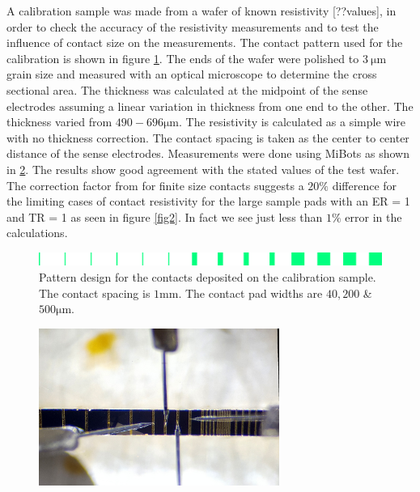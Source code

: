 A calibration sample was made from a wafer of known resistivity [??values], in order to check the accuracy of the resistivity measurements and to test the influence of contact size on the measurements. The contact pattern used for the calibration is shown in figure \ref{fig:testwafer}. The ends of the wafer were polished to $\SI{3}{\micro\meter}$ grain size and measured with an optical microscope to determine the cross sectional area. The thickness was calculated at the midpoint of the sense electrodes assuming a linear variation in thickness from one end to the other. The thickness varied from $490 - 696 \si{\micro \meter}$. The resistivity is calculated as a simple wire with no thickness correction. The contact spacing is taken as the center to center distance of the sense electrodes. Measurements were done using MiBots as shown in \ref{mibotcalibration}. The results show good agreement with the stated values of the test wafer. The correction factor from \cite{Zimney2007CorrectionStudy} for finite size contacts suggests a $20\%$ difference for the limiting cases of contact resistivity for the large sample pads with an ER = 1 and TR = 1 as seen in figure \ref{fig2}. In fact we see just less than $1\%$ error in the calculations. 


\begin{figure}[!htb]
    \centering
    \includegraphics[width=\textwidth]{fig/Results/testwafer.png}
    \caption{Pattern design for the contacts deposited on the calibration sample. The contact spacing is $1\si{\mm}$. The contact pad widths are $40, 200$ \& $500 \si{\micro\meter}$. }
    \label{fig:testwafer}
\end{figure}


\begin{figure}[t]
  \centering
    \includegraphics[width=0.7\textwidth]{fig/MiBots/closeup.jpg}
 \caption{}
\label{mibotcalibration}
\end{figure}
